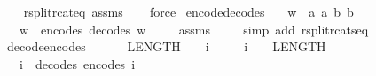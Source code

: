 \begin{isabellebody}
%
\isadelimproof
\ \ %
\endisadelimproof
%
\isatagproof
{}\isamarkupfalse%
\ rsplit{\isacharunderscore}{\kern0pt}rcat{\isacharunderscore}{\kern0pt}eq\ assms\isanewline
\ \ \isamarkupfalse%
\ force%
\endisatagproof
{\isafoldproof}%
%
\isadelimproof
\isanewline
%
\endisadelimproof
\isanewline
{}\isamarkupfalse%
\ encode{\isacharunderscore}{\kern0pt}decode{\isacharunderscore}{\kern0pt}s{}{}{\isacharcolon}{\kern0pt}\isanewline
\ \ \ {\isachardoublequoteopen}w\ {\isacharequal}{\kern0pt}\ {\isacharbrackleft}{\kern0pt}a{}{\isacharcomma}{\kern0pt}\ a{}{\isacharcomma}{\kern0pt}\ b{}{\isacharcomma}{\kern0pt}\ b{}{\isacharbrackright}{\kern0pt}{\isachardoublequoteclose}\isanewline
\ \ \ {\isachardoublequoteopen}w\ {\isacharequal}{\kern0pt}\ encode{\isacharunderscore}{\kern0pt}s{}{}\ {\isacharparenleft}{\kern0pt}decode{\isacharunderscore}{\kern0pt}s{}{}\ w{\isacharparenright}{\kern0pt}{\isachardoublequoteclose}\ \isanewline
%
\isadelimproof
\ \ %
\endisadelimproof
%
\isatagproof
{}\isamarkupfalse%
\ assms\ \isanewline
\ \ \isamarkupfalse%
\ {\isacharparenleft}{\kern0pt}simp\ add{\isacharcolon}{\kern0pt}\ rsplit{\isacharunderscore}{\kern0pt}rcat{\isacharunderscore}{\kern0pt}s{}{}{\isacharunderscore}{\kern0pt}eq{\isacharparenright}{\kern0pt}%
\endisatagproof
{\isafoldproof}%
%
\isadelimproof
\isanewline
%
\endisadelimproof
\isanewline
{}\isamarkupfalse%
\ decode{\isacharunderscore}{\kern0pt}encode{\isacharunderscore}{\kern0pt}s{}{}{\isacharcolon}{\kern0pt}\isanewline
\ \ \ {\isachardoublequoteopen}{\isacharminus}{\kern0pt}\ {\isacharparenleft}{\kern0pt}{}\ {\isacharcircum}{\kern0pt}\ {\isacharparenleft}{\kern0pt}LENGTH{\isacharparenleft}{\kern0pt}{}{}{\isacharparenright}{\kern0pt}\ {\isacharminus}{\kern0pt}\ {}{\isacharparenright}{\kern0pt}{\isacharparenright}{\kern0pt}\ {\isasymle}\ i{\isachardoublequoteclose}\isanewline
\ \ \ \ \ {\isachardoublequoteopen}i\ {\isacharless}{\kern0pt}\ {}\ {\isacharcircum}{\kern0pt}\ {\isacharparenleft}{\kern0pt}LENGTH{\isacharparenleft}{\kern0pt}{}{}{\isacharparenright}{\kern0pt}\ {\isacharminus}{\kern0pt}\ {}{\isacharparenright}{\kern0pt}{\isachardoublequoteclose}\isanewline
\ \ \ {\isachardoublequoteopen}i\ {\isacharequal}{\kern0pt}\ decode{\isacharunderscore}{\kern0pt}s{}{}\ {\isacharparenleft}{\kern0pt}encode{\isacharunderscore}{\kern0pt}s{}{}\ i{\isacharparenright}{\kern0pt}{\isachardoublequoteclose}\ \isanewline

\end{isabellebody}
